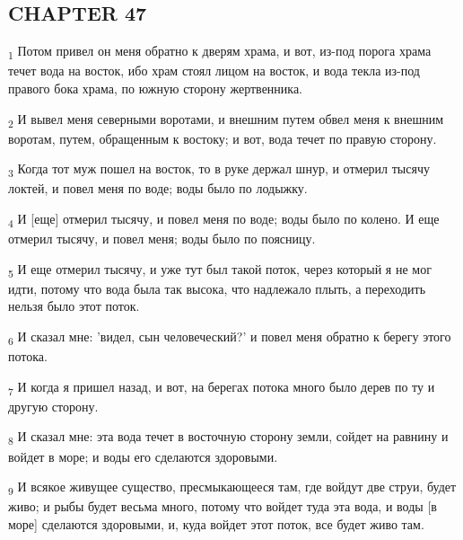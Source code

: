 \subsection{CHAPTER 47}
\begin{tcolorbox}
\textsubscript{1} Потом привел он меня обратно к дверям храма, и вот, из-под порога храма течет вода на восток, ибо храм стоял лицом на восток, и вода текла из-под правого бока храма, по южную сторону жертвенника.
\end{tcolorbox}
\begin{tcolorbox}
\textsubscript{2} И вывел меня северными воротами, и внешним путем обвел меня к внешним воротам, путем, обращенным к востоку; и вот, вода течет по правую сторону.
\end{tcolorbox}
\begin{tcolorbox}
\textsubscript{3} Когда тот муж пошел на восток, то в руке держал шнур, и отмерил тысячу локтей, и повел меня по воде; воды было по лодыжку.
\end{tcolorbox}
\begin{tcolorbox}
\textsubscript{4} И [еще] отмерил тысячу, и повел меня по воде; воды было по колено. И еще отмерил тысячу, и повел меня; воды было по поясницу.
\end{tcolorbox}
\begin{tcolorbox}
\textsubscript{5} И еще отмерил тысячу, и уже тут был такой поток, через который я не мог идти, потому что вода была так высока, что надлежало плыть, а переходить нельзя было этот поток.
\end{tcolorbox}
\begin{tcolorbox}
\textsubscript{6} И сказал мне: 'видел, сын человеческий?' и повел меня обратно к берегу этого потока.
\end{tcolorbox}
\begin{tcolorbox}
\textsubscript{7} И когда я пришел назад, и вот, на берегах потока много было дерев по ту и другую сторону.
\end{tcolorbox}
\begin{tcolorbox}
\textsubscript{8} И сказал мне: эта вода течет в восточную сторону земли, сойдет на равнину и войдет в море; и воды его сделаются здоровыми.
\end{tcolorbox}
\begin{tcolorbox}
\textsubscript{9} И всякое живущее существо, пресмыкающееся там, где войдут две струи, будет живо; и рыбы будет весьма много, потому что войдет туда эта вода, и воды [в море] сделаются здоровыми, и, куда войдет этот поток, все будет живо там.
\end{tcolorbox}
